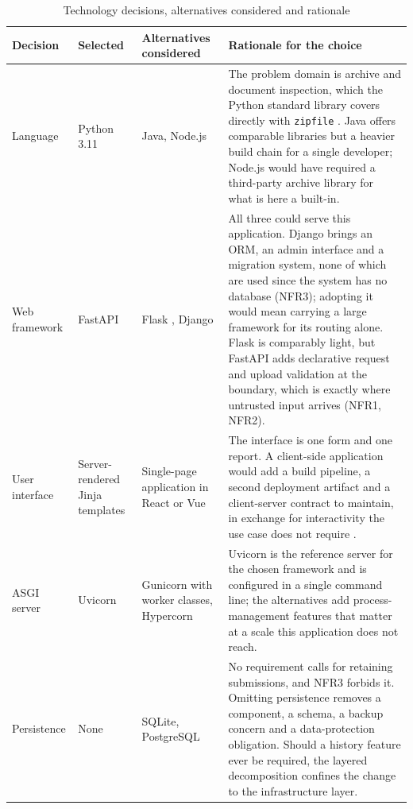 \documentclass[a4paper,11pt]{article}
\begin{document}
\begin{table}[H]
\centering
\caption{Technology decisions, alternatives considered and rationale}
\label{tab:alternatives}
\footnotesize
\renewcommand{\arraystretch}{1.2}
\setlength{\tabcolsep}{4pt}
\begin{tabularx}{\textwidth}{|p{2.3cm}|p{2.2cm}|p{2.9cm}|X|}
\hline
\rowcolor{gray!15}
\textbf{Decision} & \textbf{Selected} & \textbf{Alternatives considered} & \textbf{Rationale for the choice} \\
\hline
\hline
Language & Python 3.11 & Java, Node.js & The problem domain is archive and document inspection, which the Python standard library covers directly with \texttt{zipfile} \citep{PSF2025}. Java offers comparable libraries but a heavier build chain for a single developer; Node.js would have required a third-party archive library for what is here a built-in. \\
\hline
Web framework & FastAPI \citep{FastAPI2025} & Flask \citep{Flask2025}, Django \citep{Django2025} & All three could serve this application. Django brings an ORM, an admin interface and a migration system, none of which are used since the system has no database (NFR3); adopting it would mean carrying a large framework for its routing alone. Flask is comparably light, but FastAPI adds declarative request and upload validation at the boundary, which is exactly where untrusted input arrives (NFR1, NFR2). \\
\hline
User interface & Server-rendered Jinja templates \citep{Jinja2025} & Single-page application in React or Vue & The interface is one form and one report. A client-side application would add a build pipeline, a second deployment artifact and a client-server contract to maintain, in exchange for interactivity the use case does not require \citep{Richards2020}. \\
\hline
ASGI server & Uvicorn \citep{Uvicorn2025} & Gunicorn with worker classes, Hypercorn & Uvicorn is the reference server for the chosen framework and is configured in a single command line; the alternatives add process-management features that matter at a scale this application does not reach. \\
\hline
Persistence & None & SQLite, PostgreSQL & No requirement calls for retaining submissions, and NFR3 forbids it. Omitting persistence removes a component, a schema, a backup concern and a data-protection obligation. Should a history feature ever be required, the layered decomposition confines the change to the infrastructure layer. \\

\end{tabularx}
\end{table}
\end{document}
